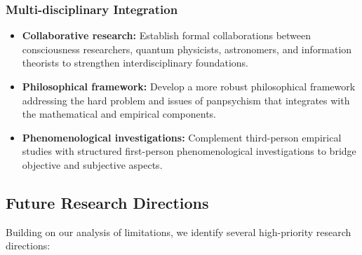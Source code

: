 \documentclass[12pt]{article}
\begin{document}
\subsubsection{Multi-disciplinary Integration}

\begin{itemize}
    \item \textbf{Collaborative research:} Establish formal collaborations between consciousness researchers, quantum physicists, astronomers, and information theorists to strengthen interdisciplinary foundations.
    
    \item \textbf{Philosophical framework:} Develop a more robust philosophical framework addressing the hard problem and issues of panpsychism that integrates with the mathematical and empirical components.
    
    \item \textbf{Phenomenological investigations:} Complement third-person empirical studies with structured first-person phenomenological investigations to bridge objective and subjective aspects.
\end{itemize}

\subsection{Future Research Directions}

Building on our analysis of limitations, we identify several high-priority research directions:
\end{document}
